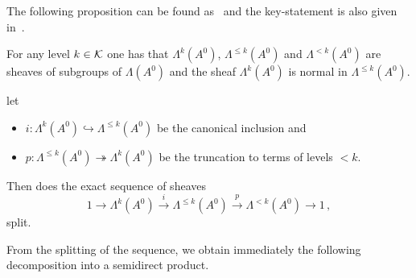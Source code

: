 The following proposition can be found as~\cite[Prop.I.5.1]{Loday1994} and the
key-statement is also given in~\cite[Prop.4.10]{Martinet1991}.
\begin{prop}\label{prop:PropertiesOfStokesSheafSplitting}
  For any level $k\in\mathcal{K}$ one has that $\Lambda^{k}(A^0)$, $\Lambda^{\leq
  k}(A^0)$ and $\Lambda^{<k}(A^0)$ are sheaves of subgroups of $\Lambda(A^0)$
  and the sheaf $\Lambda^k(A^0)$ is normal in $\Lambda^{\leq k}(A^0)$.
  \begin{comment}
    A subgroup $N$ is normal in $G$ ($N\vartriangleleft G$) if it is stable
    under conjugation, i.e.
    \[
      N\vartriangleleft G \Leftrightarrow \forall n\in N \forall g\in G,
      gng^{-1}\in N ,.
    \]
  \end{comment}

   let
  \begin{itemize}
    \item $i:\Lambda^k(A^0)\hookrightarrow\Lambda^{\leq k}(A^0)$ be the
      canonical inclusion and
    \item $p:\Lambda^{\leq k}(A^0)\twoheadrightarrow\Lambda^{k}(A^0)$ be the truncation to
      terms of levels $<k$.
  \end{itemize}
  Then does the exact sequence of sheaves
  \[
    1\longrightarrow\Lambda^k(A^0)
    \overset{i}\longrightarrow\Lambda^{\leq k}(A^0)
    \overset{p}\longrightarrow\Lambda^{<k}(A^0)
    \longrightarrow 1 \,,
  \]
  split.
\end{prop}
From the splitting of the sequence, we obtain immediately the following
decomposition into a semidirect product.
